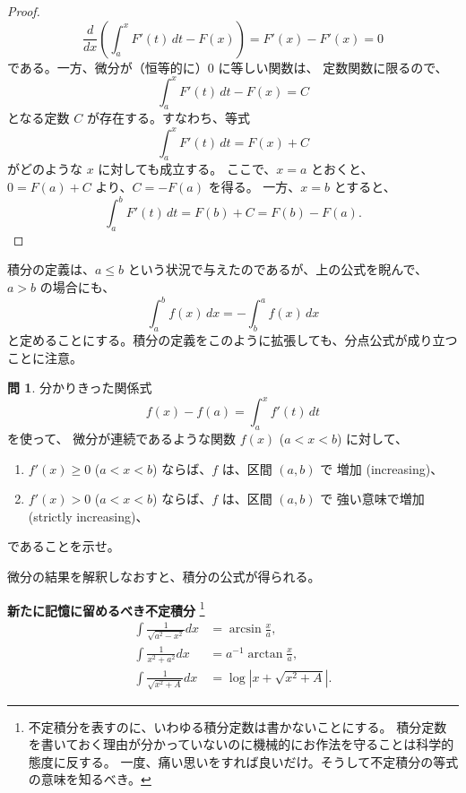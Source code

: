 \documentclass[a4paper]{jsarticle}
\theoremstyle{definition}
\newtheorem{Exercise}{問}%
\theoremstyle{remark}
\newtheorem{Remark}{注意}
\begin{document}
\begin{proof}
\[
\frac{d}{dx} 
\left(
\int_a^x F'(t)\,dt - F(x) 
\right) 
= F'(x) - F'(x) = 0
\]
である。一方、微分が（恒等的に）$0$ に等しい関数は、
定数関数に限るので、
\[
\int_a^x F'(t)\,dt - F(x) = C
\]
となる定数 $C$ が存在する。すなわち、等式
\[
\int_a^x F'(t)\,dt = F(x) + C
\]
がどのような $x$ に対しても成立する。
ここで、$x=a$ とおくと、
$0 = F(a) + C$ より、$C = - F(a)$ を得る。
一方、$x=b$ とすると、
\[
\int_a^b F'(t)\,dt = F(b) + C = F(b) - F(a).
\]
\end{proof}


積分の定義は、$a \leq b$ という状況で与えたのであるが、上の公式を睨んで、
$a > b$ の場合にも、
\[
\int_a^b f(x)\, dx = - \int_b^a f(x)\, dx 
\]
と定めることにする。積分の定義をこのように拡張しても、分点公式が成り立つことに注意。


\begin{Exercise}
分かりきった関係式
\[
f(x) - f(a) = \int_a^x f'(t)\,dt
\]
を使って、
微分が連続であるような関数 $f(x)$ ($a < x < b$) に対して、
\begin{enumerate}
\item
$f'(x)\geq 0$ ($a < x < b$) ならば、$f$ は、区間 $(a,b)$ で
増加 (increasing)、
\item $f'(x) > 0$ ($a < x < b$) ならば、$f$ は、区間 $(a,b)$ で
強い意味で増加 (strictly increasing)、
\end{enumerate}
であることを示せ。
\end{Exercise}

\par
\bigskip
微分の結果を解釈しなおすと、積分の公式が得られる。

\medskip
\noindent
\textbf{新たに記憶に留めるべき不定積分}
\footnote{不定積分を表すのに、いわゆる積分定数は書かないことにする。
積分定数を書いておく理由が分かっていないのに機械的にお作法を守ることは科学的態度に反する。
一度、痛い思いをすれば良いだけ。そうして不定積分の等式の意味を知るべき。}
\begin{align*}
\int \frac{1}{\sqrt{a^2-x^2}} dx &= \arcsin \frac{x}{a},\\
\int \frac{1}{x^2 + a^2} dx &= a^{-1}\arctan \frac{x}{a},\\ 
\int \frac{1}{\sqrt{x^2 + A}}dx &= \log|x + \sqrt{x^2+A}|.
\end{align*}

\end{document}

